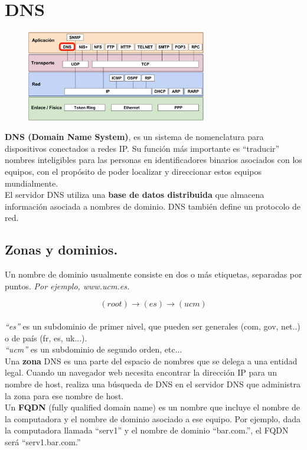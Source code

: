 \section{DNS}
\begin{figure}[H]\centering\includegraphics[width=0.7\textwidth]{img/DNS.png}
\end{figure}
\textbf{DNS (Domain Name System)}, es un sistema de nomenclatura  para dispositivos conectados a redes IP. Su función más importante es \enquote{traducir} nombres inteligibles para las personas en identificadores binarios asociados con los equipos, con el propósito de poder localizar y direccionar estos equipos mundialmente.\\

El servidor DNS utiliza una \textbf{base de datos distribuida} que almacena información asociada a nombres de dominio. DNS también define un protocolo de red.

\subsection{Zonas y dominios.}
Un nombre de dominio usualmente consiste en dos o más etiquetas, separadas por puntos. \textit{Por ejemplo, www.ucm.es.}

\[(root) \rightarrow (es) \rightarrow (ucm)\]\\
\textit{\enquote{es}} es un subdominio de primer nivel, que pueden ser generales (com, gov, net..) o de país (fr, es, uk...).\\

\textit{\enquote{ucm}} es un subdominio de segundo orden, etc...\\

Una \textbf{zona} DNS es una parte del espacio de nombres que se delega a una entidad legal. Cuando un navegador web necesita encontrar la dirección IP para un nombre de host, realiza una búsqueda de DNS en el servidor DNS que administra la zona para ese nombre de host.\\

Un \textbf{FQDN} (fully qualified domain name) es un nombre que incluye el nombre de la computadora y el nombre de dominio asociado a ese equipo. Por ejemplo, dada la computadora llamada \enquote{serv1} y el nombre de dominio \enquote{bar.com.}, el FQDN será \enquote{serv1.bar.com.}
\newpage
